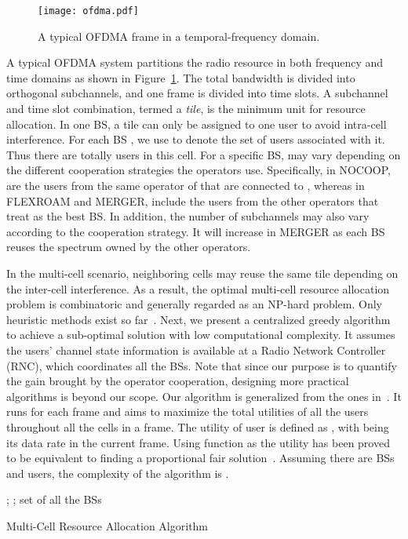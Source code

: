 \documentclass[conference]{IEEEtran}
\begin{document}
\begin{figure}[htbp]
    \vspace{-0.1in}
    \centerline{\texttt{[image: ofdma.pdf]}}
    \caption{
       A typical OFDMA frame in a temporal-frequency domain.
    }
    \label{fig:ofdma}
    \vspace{-0.1in}
\end{figure}
A typical OFDMA system partitions the radio resource in both frequency and time domains as shown in Figure~\ref{fig:ofdma}. The total bandwidth is divided into  orthogonal subchannels, and one frame is divided into  time slots. A subchannel and time slot combination, termed a \textit{tile}, is the minimum unit for resource allocation. In one BS, a tile can only be assigned to one user to avoid intra-cell interference. For each BS , we use  to denote the set of users associated with it. Thus there are totally  users in this cell. For a specific BS,  may vary depending on the different cooperation strategies the operators use. Specifically, in NOCOOP,  are the users from the same operator of  that are connected to , whereas in FLEXROAM and MERGER,  include the users from the other operators that treat  as the best BS. In addition, the number of subchannels  may also vary according to the cooperation strategy. It will increase in MERGER as each BS reuses the spectrum owned by the other operators.

In the multi-cell scenario, neighboring cells may reuse the same tile depending on the inter-cell interference. As a result, the optimal multi-cell resource allocation problem is combinatoric and generally regarded as an NP-hard problem. Only heuristic methods exist so far~\cite{Koutsopoulos@TON06}\cite{Guoqing@TWC06}\cite{Honghai@JSAC11}. Next, we present a centralized greedy algorithm to achieve a sub-optimal solution with low computational complexity. It assumes the users' channel state information is available at a Radio Network Controller (RNC), which coordinates all the BSs. Note that since our purpose is to quantify the gain brought by the operator cooperation, designing more practical algorithms is beyond our scope. Our algorithm is generalized from the ones in~\cite{Koutsopoulos@TON06}\cite{Guoqing@TWC06}. It runs for each frame and aims to maximize the total utilities of all the users throughout all the cells in a frame. The utility of user  is defined as , with  being its data rate in the current frame. Using  function as the utility has been proved to be equivalent to finding a proportional fair solution~\cite{Kelly@Fair98}. Assuming there are  BSs and  users, the complexity of the algorithm is .
\vspace{-0.1in}
\begin{algorithm}
\small {
; ; \;
\For{} {
    \For{} {
         set of all the BSs\;
    }
}
}
\label{alg:1}
\caption{Multi-Cell Resource Allocation Algorithm}
\end{algorithm}
\vspace{-0.1in}
\end{document}
